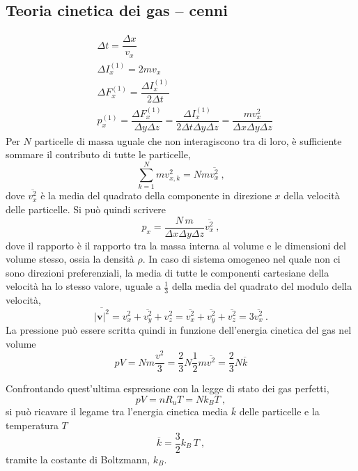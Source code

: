 \subsection{Teoria cinetica dei gas -- cenni}
\begin{equation}
\begin{aligned}
    & \Delta t = \dfrac{\Delta x}{v_x} \\
    & \Delta I^{(1)}_x = 2 m v_x \\
    & \Delta F^{(1)}_x = \dfrac{\Delta I^{(1)}_x}{2 \Delta t} \\
    & p^{(1)}_x = \dfrac{\Delta F^{(1)}_x}{\Delta y \Delta z} = \dfrac{\Delta I^{(1)}_x}{2 \Delta t \Delta y \Delta z} 
          = \dfrac{m v_x^2}{\Delta x \Delta y \Delta z}
\end{aligned}
\end{equation}
Per $N$ particelle di massa uguale che non interagiscono tra di loro, è sufficiente sommare il contributo di tutte le particelle,
\begin{equation}
    \sum_{k=1}^N m v_{x,k}^2 = N m \overline{v_x^2} \ ,
\end{equation}
dove $\overline{v_x^2}$ è la media del quadrato della componente in direzione $x$ della velocità delle particelle. Si può quindi scrivere
\begin{equation}
    p_x = \dfrac{N \, m}{\Delta x \Delta y \Delta z} \overline{ v_x^2 } \ ,
\end{equation}
dove il rapporto è il rapporto tra la massa interna al volume e le dimensioni del volume stesso, ossia la densità $\rho$.
In caso di sistema omogeneo nel quale non ci sono direzioni preferenziali, la media di tutte le componenti cartesiane della velocità ha lo stesso valore, uguale a $\frac{1}{3}$ della media del quadrato del modulo della velocità,
\begin{equation}
   \overline{|\mathbf{v}|^2} = 
    \overline{v_x^2 + v_y^2 + v_z^2} = \overline{v_x^2} + \overline{v_y^2} + \overline{v_z^2} = 3 \overline{v_x^2} \ . 
\end{equation}
La pressione può essere scritta quindi in funzione dell'energia cinetica del gas nel volume
\begin{equation}
    p V = N m \frac{v^2}{3} = \dfrac{2}{3} N \dfrac{1}{2} m \overline{v^2} = \dfrac{2}{3} N \overline{k}
\end{equation}

\noindent
Confrontando quest'ultima espressione con la legge di stato dei gas perfetti,
\begin{equation}
   p V = n R_u T = N k_B T \ ,
\end{equation}
si può ricavare il legame tra l'energia cinetica media $\overline{k}$ delle particelle e la temperatura $T$
\begin{equation}
    \overline{k} = \dfrac{3}{2} k_B \, T \ ,
\end{equation}
tramite la costante di Boltzmann, $k_B$.

